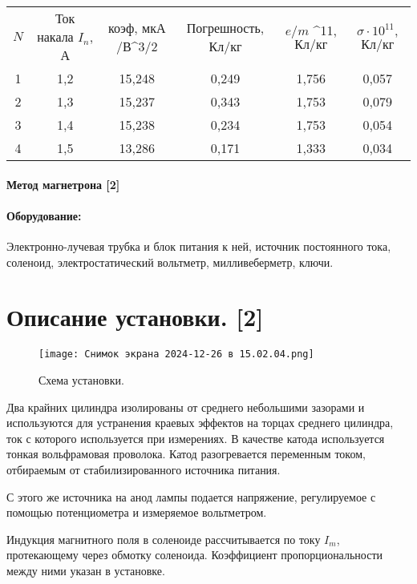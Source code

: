 \documentclass[a4paper,12pt]{article}
\theoremstyle{definition}
\begin{document}
\begin{table}[H]
    \centering
    \begin{tabular}{cccccc}
         $N$&  Ток накала $I_n$, А&  коэф, $\text{мкА}$/В^{3/2}&  Погрешность, Кл/кг&  $e/m$ \cdot 10^{11}, $Кл/кг$& $\sigma \cdot 10^{11}$, $\text{Кл/кг}$\\
         1&  1,2&  15,248&  0,249&  1,756& 0,057\\
         2&  1,3&  15,237&  0,343&  1,753& 0,079\\
         3&  1,4&  15,238&  0,234&  1,753& 0,054\\
         4&  1,5&  13,286&  0,171&  1,333& 0,034\\
    \end{tabular}

    \label{tab:my_label}
\end{table}



\paragraph*{\LARGE Метод магнетрона [2]}

\paragraph*{Оборудование:} Электронно-лучевая трубка и блок питания к ней, источник постоянного тока, соленоид, электростатический вольтметр, милливеберметр, ключи.

\section{Описание установки. [2]}

\begin{figure}[H]
    \centering
    \texttt{[image: Снимок экрана 2024-12-26 в 15.02.04.png]}
    \caption{Схема установки.}
\end{figure}
Два крайних цилиндра изолированы от среднего небольшими зазорами и используются для устранения краевых эффектов на торцах среднего цилиндра, ток с которого используется при измерениях. В качестве катода используется тонкая вольфрамовая проволока. Катод разогревается переменным током, отбираемым от стабилизированного источника питания. 

С этого же источника на анод лампы подается напряжение, регулируемое с помощью потенциометра и измеряемое вольтметром.

Индукция магнитного поля в соленоиде рассчитывается по току $I_m$, протекающему через обмотку соленоида. Коэффициент пропорциональности между ними указан в установке.
\end{document}
